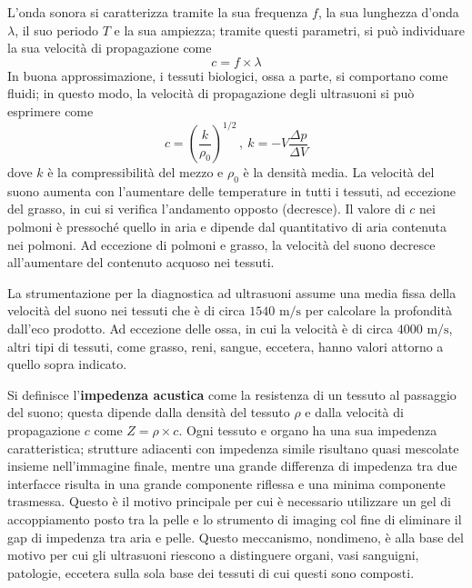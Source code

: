 \documentclass[11pt, a4paper]{scrartcl}
\theoremstyle{style}
\theoremstyle{style1}
\numberwithin{equation}{subsection}
\begin{document}
L'onda sonora si caratterizza tramite la sua frequenza $f$, la sua lunghezza d'onda $\lambda $, il suo periodo $T$ e la sua ampiezza; tramite questi parametri, si pu\`o individuare la sua velocit\`a di propagazione come 
\begin{equation}
	c = f \times \lambda 
\end{equation}
In buona approssimazione, i tessuti biologici, ossa a parte, si comportano come fluidi; in questo modo, la velocit\`a di propagazione degli ultrasuoni si pu\`o esprimere come
\begin{equation}
	c = \left(\frac{k}{\rho _0}\right) ^{1 / 2} \, , \ k = - V \frac{\Delta p}{\Delta V}
\end{equation}
dove $k$ \`e la compressibilit\`a del mezzo e $\rho _0$ \`e la densit\`a media.
La velocit\`a del suono aumenta con l'aumentare delle temperature in tutti i tessuti, ad eccezione del grasso, in cui si verifica l'andamento opposto (decresce).
Il valore di $c$ nei polmoni \`e pressoch\'e quello in aria e dipende dal quantitativo di aria contenuta nei polmoni.
Ad eccezione di polmoni e grasso, la velocit\`a del suono decresce all'aumentare del contenuto acquoso nei tessuti.

La strumentazione per la diagnostica ad ultrasuoni assume una media fissa della velocit\`a del suono nei tessuti che \`e di circa $1540 \text{ m}/\text{s}$ per calcolare la profondit\`a dall'eco prodotto.
Ad eccezione delle ossa, in cui la velocit\`a \`e di circa $4000\text{ m}/\text{s}$, altri tipi di tessuti, come grasso, reni, sangue, eccetera, hanno valori attorno a quello sopra indicato.

Si definisce l'\textbf{impedenza acustica} come la resistenza di un tessuto al passaggio del suono; questa dipende dalla densit\`a del tessuto $\rho $ e dalla velocit\`a di propagazione $c$ come $Z = \rho \times c$.
Ogni tessuto e organo ha una sua impedenza caratteristica; strutture adiacenti con impedenza simile risultano quasi mescolate insieme nell'immagine finale, mentre una grande differenza di impedenza tra due interfacce risulta in una grande componente riflessa e una minima componente trasmessa.
Questo \`e il motivo principale per cui \`e necessario utilizzare un gel di accoppiamento posto tra la pelle e lo strumento di imaging col fine di eliminare il gap di impedenza tra aria e pelle.
Questo meccanismo, nondimeno, \`e alla base del motivo per cui gli ultrasuoni riescono a distinguere organi, vasi sanguigni, patologie, eccetera sulla sola base dei tessuti di cui questi sono composti.
\end{document}

